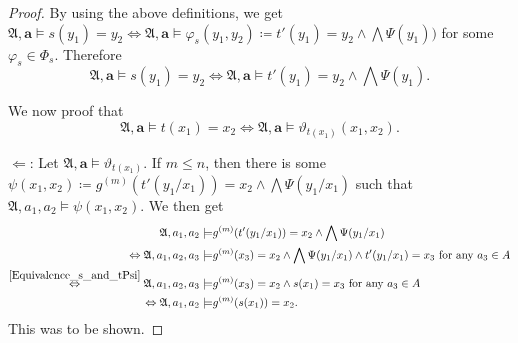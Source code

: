 \documentclass[a4paper,11pt,DIV=15]{scrartcl} %
\renewcommand{\phi}{\varphi}
\theoremstyle{plain}
\theoremstyle{definition}
\renewcommand{\theta}{\vartheta}
\begin{document}
\begin{proof}
	By using the above definitions, we get $\mathfrak A,\mathbf a\models s(y_1)=y_2 \Leftrightarrow \mathfrak A,\mathbf a\models \phi_s(y_1,y_2)\coloneqq t'(y_1)=y_2 \land \bigwedge \Psi(y_1))$ for some $\phi_s\in\Phi_s$.
	Therefore
	\begin{equation}
		\mathfrak A, \mathbf a \models s(y_1)=y_2 \Longleftrightarrow \mathfrak A,\mathbf a \models t'(y_1)=y_2 \land \bigwedge \Psi(y_1).
		\label{Equivalence_s_and_tPsi}
	\end{equation}
	
	We now proof that 
	$$\mathfrak A, \mathbf a\models t(x_1)=x_2 \Longleftrightarrow \mathfrak A,\mathbf a\models \theta_{t(x_1)}(x_1,x_2).$$
	
	$\Longleftarrow$: 
	Let $\mathfrak A, \mathbf a \models \theta_{t(x_1)}$.
	If $m\leq n$, then there is some $\psi(x_1,x_2)\coloneqq g^{(m)}(t'(y_1/x_1))=x_2 \land \bigwedge \Psi(y_1/x_1)$ such that $\mathfrak A,a_1,a_2\models \psi(x_1,x_2)$.
	We then get
	\begin{align*}
		\mathfrak A,a_1,a_2 \models & g^{(m)}(t'(y_1/x_1))=x_2 \land \bigwedge \Psi(y_1/x_1) \\
		\Leftrightarrow \mathfrak A,a_1,a_2,a_3 \models & g^{(m)}(x_3)=x_2 \land \bigwedge \Psi(y_1/x_1) \land t'(y_1/x_1)=x_3 \text{ for any } a_3\in A \\
		\overset{\cref{Equivalence_s_and_tPsi}}{\Leftrightarrow} \mathfrak A,a_1,a_2,a_3\models & g^{(m)}(x_3)=x_2 \land s(x_1)=x_3 \text{ for any } a_3\in A \\
		\Leftrightarrow \mathfrak A,a_1,a_2 \models & g^{(m)}(s(x_1))=x_2.
	\end{align*}
	This was to be shown.
	

\end{proof}
\end{document}
